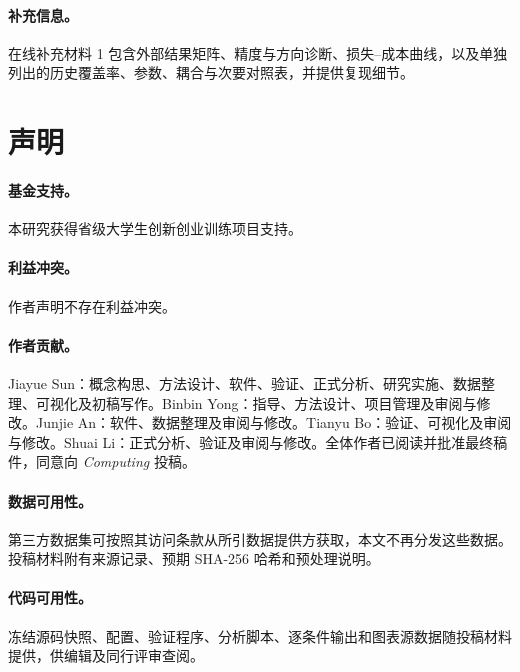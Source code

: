 \documentclass[smallextended]{svjour3}
\begin{document}
\paragraph{补充信息。}在线补充材料 1 包含外部结果矩阵、精度与方向诊断、损失--成本曲线，以及单独列出的历史覆盖率、参数、耦合与次要对照表，并提供复现细节。
\section*{声明}
\paragraph{基金支持。}本研究获得省级大学生创新创业训练项目支持。
\paragraph{利益冲突。}作者声明不存在利益冲突。
\paragraph{作者贡献。}Jiayue Sun：概念构思、方法设计、软件、验证、正式分析、研究实施、数据整理、可视化及初稿写作。Binbin Yong：指导、方法设计、项目管理及审阅与修改。Junjie An：软件、数据整理及审阅与修改。Tianyu Bo：验证、可视化及审阅与修改。Shuai Li：正式分析、验证及审阅与修改。全体作者已阅读并批准最终稿件，同意向 \textit{Computing} 投稿。
\paragraph{数据可用性。}第三方数据集可按照其访问条款从所引数据提供方获取，本文不再分发这些数据。投稿材料附有来源记录、预期 SHA-256 哈希和预处理说明。
\paragraph{代码可用性。}冻结源码快照、配置、验证程序、分析脚本、逐条件输出和图表源数据随投稿材料提供，供编辑及同行评审查阅。

\end{document}

